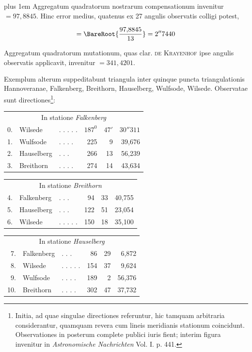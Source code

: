 
{\rightskip=0pt plus 1em Aggregatum quadratorum nostrarum compensationum invenitur \(=97{,}8845\). Hinc error medius, quatenus ex 27 angulis observatis colligi potest,\par}
\[
=\BareRoot{\frac{97{,}8845}{13}}=2''7440
\]

Aggregatum quadratorum mutationum, quas clar. \textsc{de Krayenhof} ipse angulis observatis applicavit, invenitur \(=341{,}4201\).

Exemplum alterum suppeditabunt triangula inter quinque puncta triangulationis Hannoveranae, Falkenberg, Breithorn, Hauselberg, Wulfsode, Wilsede. Observatae sunt directiones\footnote{Initia, ad quae singulae directiones referuntur, hic tamquam arbitraria considerantur, quamquam revera cum lineis meridianis stationum coincidunt. Observationes in posterum complete publici iuris fient; interim figura invenitur in \textit{Astronomische Nachrichten} Vol. I. p. 441.}:
\begin{center}
\begin{tabular}{r l l r r r}
\multicolumn{6}{c}{In statione \textit{Falkenberg}}\\[5pt]
0.&Wilsede&. . . . .&\(187^0\)&\(47'\)&\(30''311\)\\
1.&Wulfsode&. . . .&225&9&39,676\\
2.&Hauselberg&. . .&266&13&56,239\\
3.&Breithorn&. . . .&274&14&43,634
\end{tabular}
\end{center}
\begin{center}
\begin{tabular}{r l l r r r}
\multicolumn{6}{c}{In statione \textit{Breithorn}}\\[5pt]
4.&Falkenberg&. . .&94&33&40,755\\
5.&Hauselberg&. . .&122&51&23,054\\
6.&Wilsede&. . . . .&150&18&35,100
\end{tabular}
\end{center}
\begin{center}
\begin{tabular}{r l l r r r}
\multicolumn{6}{c}{In statione \textit{Hauselberg}}\\[5pt]
7.&Falkenberg&. . .&86&29&6,872\\
8.&Wilsede&. . . . .&154&37&9,624\\
9.&Wulfsode&. . . .&189&2&56,376\\
10.&Breithorn&. . . .&302&47&37,732
\end{tabular}
\end{center}
